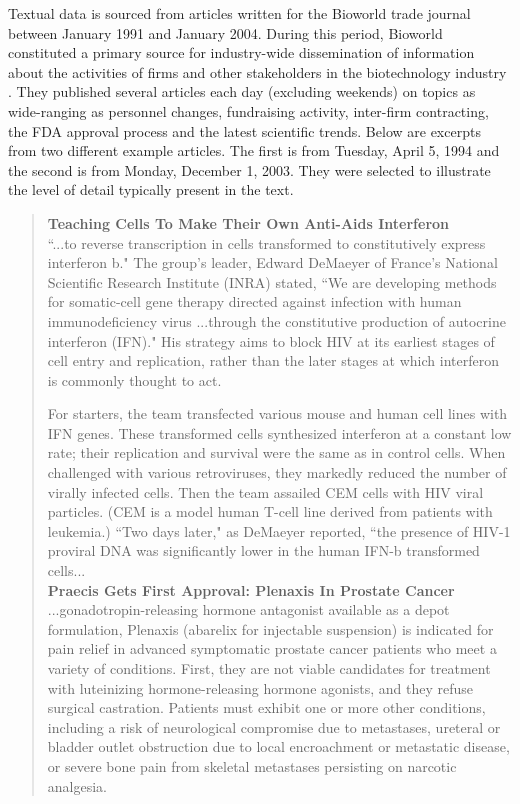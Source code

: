 Textual data is sourced from articles written for the Bioworld trade journal between January 1991 and January 2004. During this period, Bioworld constituted a primary source for industry-wide dissemination of information about the activities of firms and other stakeholders in the biotechnology industry \citep{wolff2001}. They published several articles each day (excluding weekends) on topics as wide-ranging as personnel changes, fundraising activity, inter-firm contracting, the FDA approval process and the latest scientific trends. Below are excerpts from two different example articles. The first is from Tuesday, April 5, 1994 and the second is from Monday, December 1, 2003. They were selected to illustrate the level of detail typically present in the text.

\begin{singlespace}
\begin{small}
\begin{quotation}
\noindent \textbf{Teaching Cells To Make Their Own Anti-Aids Interferon} \\

``...to reverse transcription in cells transformed to constitutively express interferon b." The group's leader, Edward DeMaeyer of France's National Scientific Research Institute (INRA) stated, ``We are developing methods for somatic-cell gene therapy directed against infection with human immunodeficiency virus ...through the constitutive production of autocrine interferon (IFN)." His strategy aims to block HIV at its earliest stages of cell entry and replication, rather than the later stages at which interferon is commonly thought to act.

For starters, the team transfected various mouse and human cell lines with IFN genes. These transformed cells synthesized interferon at a constant low rate; their replication and survival were the same as in control cells. When challenged with various retroviruses, they markedly reduced the number of virally infected cells. Then the team assailed CEM cells with HIV viral particles. (CEM is a model human T-cell line derived from patients with leukemia.) ``Two days later," as DeMaeyer reported, ``the presence of HIV-1 proviral DNA was significantly lower in the human IFN-b transformed cells...\\

\noindent \textbf{Praecis Gets First Approval: Plenaxis In Prostate Cancer} \\

...gonadotropin-releasing hormone antagonist available as a depot formulation, Plenaxis (abarelix for injectable suspension) is indicated for pain relief in advanced symptomatic prostate cancer patients who meet a variety of conditions. First, they are not viable candidates for treatment with luteinizing hormone-releasing hormone agonists, and they refuse surgical castration. Patients must exhibit one or more other conditions, including a risk of neurological compromise due to metastases, ureteral or bladder outlet obstruction due to local encroachment or metastatic disease, or severe bone pain from skeletal metastases persisting on narcotic analgesia.


\end{quotation}
\end{small}
\end{singlespace}
